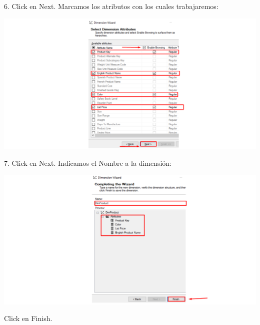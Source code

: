 6. Click en Next.
Marcamos los atributos con los cuales trabajaremos:
    
	\begin{center}
	\includegraphics[width=\columnwidth]{images/task1/img6}
    \end{center}	

7. Click en Next.
Indicamos el Nombre a la dimensión:
    
	\begin{center}
	\includegraphics[width=\columnwidth]{images/task1/img7}
    \end{center}	

Click en Finish.

    